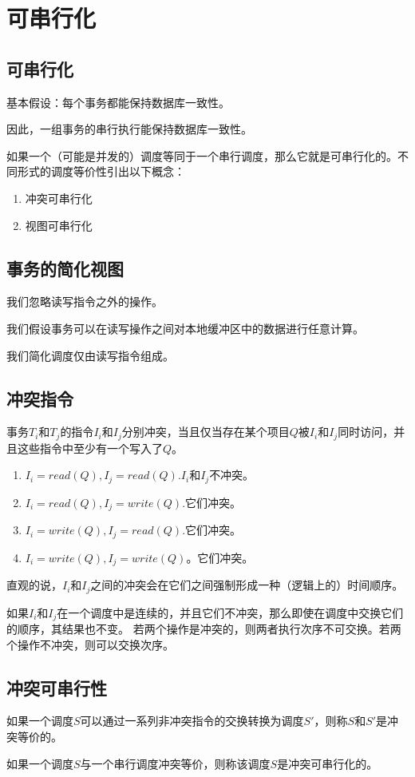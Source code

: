 \section{可串行化}

\subsection{可串行化}

基本假设：每个事务都能保持数据库一致性。

因此，一组事务的串行执行能保持数据库一致性。

如果一个（可能是并发的）调度等同于一个串行调度，那么它就是可串行化的。不同形式的调度等价性引出以下概念：
\begin{enumerate}
    \item 冲突可串行化
    \item 视图可串行化
\end{enumerate}

\subsection{事务的简化视图}

我们忽略读写指令之外的操作。

我们假设事务可以在读写操作之间对本地缓冲区中的数据进行任意计算。

我们简化调度仅由读写指令组成。

\subsection{冲突指令}

事务$T_i$和$T_j$的指令$I_i$和$I_j$分别冲突，当且仅当存在某个项目$Q$被$I_i$和$I_j$同时访问，并且这些指令中至少有一个写入了$Q$。
\begin{enumerate}
    \item $I_i=read(Q),I_j=read(Q)$.$I_i$和$I_j$不冲突。
    \item $I_i=read(Q),I_j=write(Q)$.它们冲突。
    \item $I_i=write(Q),I_j=read(Q)$.它们冲突。
    \item $I_i=write(Q),I_j=write(Q)$。它们冲突。
\end{enumerate}

直观的说，$I_i$和$I_j$之间的冲突会在它们之间强制形成一种（逻辑上的）时间顺序。

如果$I_i$和$I_j$在一个调度中是连续的，并且它们不冲突，那么即使在调度中交换它们的顺序，其结果也不变。
若两个操作是冲突的，则两者执行次序不可交换。若两个操作不冲突，则可以交换次序。

\subsection{冲突可串行性}

如果一个调度$S$可以通过一系列非冲突指令的交换转换为调度$S'$，则称$S$和$S'$是冲突等价的。

如果一个调度$S$与一个串行调度冲突等价，则称该调度$S$是冲突可串行化的。

